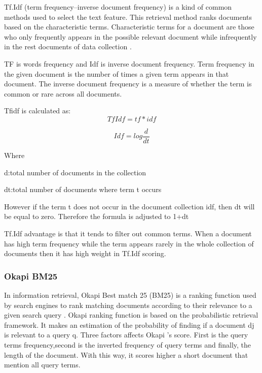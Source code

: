 \documentclass{article}
\begin{document}
Tf.Idf (term frequency–inverse document frequency) is a kind of common methods used to select the text feature. This retrieval method ranks documents based on the characteristic terms. Characteristic terms for a document are those who only frequently appears in the possible relevant document while infrequently in the rest documents of data collection \cite{ShouningSujuanYan}.

TF is words frequency and Idf is inverse document frequency. Term frequency in the given document is the number of times a given term appears in that document. The inverse document frequency is a measure of whether the term is common or rare across all documents.

Tfidf  is calculated as:
\begin{equation}
	TfIdf= tf * idf
\end{equation}

\begin{equation}
	Idf=log \frac{ d }{ dt}
\end{equation}

Where

d:total number of documents in the collection

dt:total number of documents where term t occurs

However if the term t does not occur in the document collection idf, then dt will be equal to zero. Therefore the formula is adjusted to 1+dt

Tf.Idf advantage is that it tends to filter out common terms. When a document has high term frequency while the term appears rarely in the whole collection of documents then it has high weight in Tf.Idf scoring.


\subsubsection{Okapi BM25}

In information retrieval, Okapi Best match 25 (BM25)  is a ranking function used by search engines to rank matching documents according to their relevance to a given search query \cite{WikiOkapi} . Okapi ranking function is based on the probabilistic retrieval framework. It makes an estimation of the probability of finding if a document dj is relevant to a query q. Three factors affects Okapi ’s score. First is the query terms frequency,second is the inverted frequency of query terms and finally, the length of the document. With this way, it scores higher a short document that mention all query terms.
\end{document}
